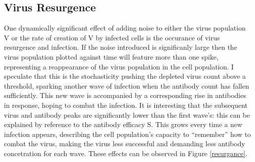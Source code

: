 \documentclass[a4paper, 12pt]{report}
\begin{document}
\subsection{Virus Resurgence}

One dynamically significant effect of adding noise to either the virus population V or the rate of creation of V by infected cells is the occurance of virus resurgence and infection. If the noise introduced is significanly large then the virus population plotted against time will feature more than one spike, representing a reappearance of the virus population in the cell population. I speculate that this is the stochasticity pushing the depleted virus count above a threshold, sparking another wave of infection when the antibody count has fallen sufficiently. This new wave is accompanied by a corresponding rise in antibodies in response, hoping to combat the infection. It is interesting that the subsequent virus and antibody peaks are significantly lower than the first wave's: this can be explained by reference to the antibody efficacy S. This grows every time a new infection appears, describing the cell population's capacity to ``remember'' how to combat the virus, making the virus less successful and demanding less antibody concetration for each wave. These effects can be observed in Figure \ref{resurgance}.
\end{document}
